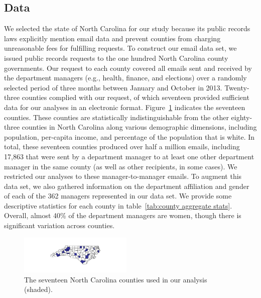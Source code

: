 \documentclass{pnastwo}
\begin{document}
\begin{article}
\section{Data}

We selected the state of North Carolina for our study because its
public records laws explicitly mention email data and prevent counties
from charging unreasonable fees for fulfilling requests. To construct
our email data set, we issued public records requests to the one
hundred North Carolina county governments. Our request to each county
covered all emails sent and received by the department managers (e.g.,
health, finance, and elections) over a randomly selected period of
three months between January and October in 2013. Twenty-three
counties complied with our request, of which seventeen provided
sufficient data for our analyses in an electronic
format. Figure~\ref{fig:nc map} indicates the seventeen
counties. These counties are statistically indistinguishable from
the other eighty-three counties in North Carolina along various
demographic dimensions, including population, per-capita income, and
percentage of the population that is white. In total, these seventeen
counties produced over half a million emails, including 17,863 that
were sent by a department manager to at least one other department
manager in the same county (as well as other recipients, in some
cases). We restricted our analyses to these manager-to-manager
emails. To augment this data set, we also gathered information on the
department affiliation and gender of each of the 362 managers
represented in our data set. We provide some descriptive statistics
for each county in table~\ref{tab:county aggregate stats}. Overall,
almost 40\% of the department managers are women, though there is
significant variation across counties.

\begin{figure}
  \centering
  \caption{\label{fig:nc map}The seventeen North Carolina counties
    used in our analysis (shaded).} \centering
  \includegraphics[width=0.48\textwidth]{images/County_Map.pdf}
\end{figure}


\end{article}
\end{document}
